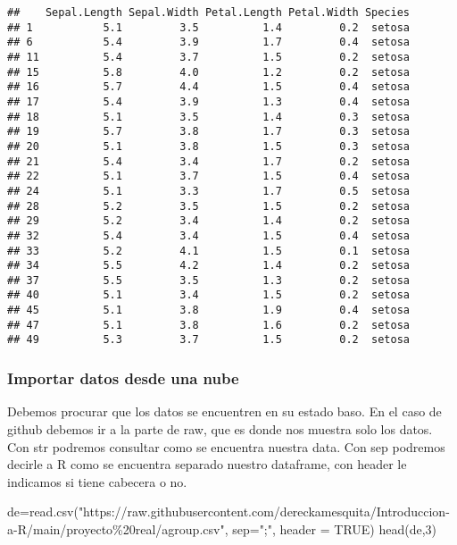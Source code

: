 \documentclass[
]{article}
\newenvironment{Shaded}{\begin{snugshade}}{\end{snugshade}}
\newcommand{\AttributeTok}[1]{\textcolor[rgb]{0.77,0.63,0.00}{#1}}
\newcommand{\ConstantTok}[1]{\textcolor[rgb]{0.00,0.00,0.00}{#1}}
\newcommand{\DecValTok}[1]{\textcolor[rgb]{0.00,0.00,0.81}{#1}}
\newcommand{\FunctionTok}[1]{\textcolor[rgb]{0.00,0.00,0.00}{#1}}
\newcommand{\NormalTok}[1]{#1}
\newcommand{\OtherTok}[1]{\textcolor[rgb]{0.56,0.35,0.01}{#1}}
\newcommand{\StringTok}[1]{\textcolor[rgb]{0.31,0.60,0.02}{#1}}
\begin{document}
\begin{verbatim}
##    Sepal.Length Sepal.Width Petal.Length Petal.Width Species
## 1           5.1         3.5          1.4         0.2  setosa
## 6           5.4         3.9          1.7         0.4  setosa
## 11          5.4         3.7          1.5         0.2  setosa
## 15          5.8         4.0          1.2         0.2  setosa
## 16          5.7         4.4          1.5         0.4  setosa
## 17          5.4         3.9          1.3         0.4  setosa
## 18          5.1         3.5          1.4         0.3  setosa
## 19          5.7         3.8          1.7         0.3  setosa
## 20          5.1         3.8          1.5         0.3  setosa
## 21          5.4         3.4          1.7         0.2  setosa
## 22          5.1         3.7          1.5         0.4  setosa
## 24          5.1         3.3          1.7         0.5  setosa
## 28          5.2         3.5          1.5         0.2  setosa
## 29          5.2         3.4          1.4         0.2  setosa
## 32          5.4         3.4          1.5         0.4  setosa
## 33          5.2         4.1          1.5         0.1  setosa
## 34          5.5         4.2          1.4         0.2  setosa
## 37          5.5         3.5          1.3         0.2  setosa
## 40          5.1         3.4          1.5         0.2  setosa
## 45          5.1         3.8          1.9         0.4  setosa
## 47          5.1         3.8          1.6         0.2  setosa
## 49          5.3         3.7          1.5         0.2  setosa
\end{verbatim}

\hypertarget{importar-datos-desde-una-nube}{%
\subsubsection{Importar datos desde una
nube}\label{importar-datos-desde-una-nube}}

Debemos procurar que los datos se encuentren en su estado baso. En el
caso de github debemos ir a la parte de raw, que es donde nos muestra
solo los datos. Con str podremos consultar como se encuentra nuestra
data. Con sep podremos decirle a R como se encuentra separado nuestro
dataframe, con header le indicamos si tiene cabecera o no.

\begin{Shaded}
\begin{Highlighting}[]
\NormalTok{de}\OtherTok{=}\FunctionTok{read.csv}\NormalTok{(}\StringTok{"https://raw.githubusercontent.com/dereckamesquita/Introduccion{-}a{-}R/main/proyecto\%20real/agroup.csv"}\NormalTok{, }\AttributeTok{sep=}\StringTok{";"}\NormalTok{, }\AttributeTok{header =} \ConstantTok{TRUE}\NormalTok{)}
\FunctionTok{head}\NormalTok{(de,}\DecValTok{3}\NormalTok{)}
\end{Highlighting}
\end{Shaded}
\end{document}
